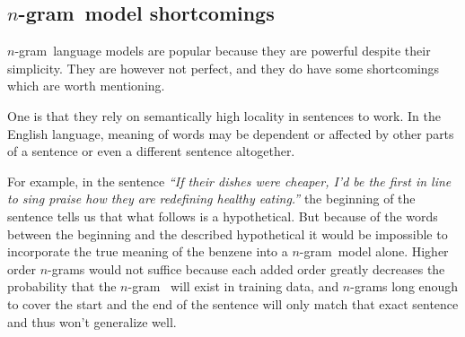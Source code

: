 \documentclass[a4paper,11pt]{kth-mag}
\newcommand{\ngram}{$n$-gram}
\begin{document}



\subsection{\ngram~model shortcomings}
\ngram~language models are popular because they are powerful despite their simplicity. They are however not
perfect, and they do have some shortcomings which are worth mentioning.

One is that they rely on semantically high locality in sentences to work. In the English language, meaning of words
may be dependent or affected by other parts of a sentence or even a different sentence altogether.

For example, in the sentence \emph{``If their dishes were cheaper, I'd be the first in line to sing praise how they are redefining healthy eating.''} the beginning of the sentence tells us that what follows is a hypothetical. But because of the words between the beginning and the described hypothetical it would be impossible to incorporate the
true meaning of the benzene into a \ngram~model alone. Higher order \ngram s would not suffice because each added order greatly decreases the probability that the \ngram~ will exist in training data, and \ngram s long enough to cover the start and the end of the sentence will only match that exact sentence and thus won't generalize well.




\end{document}
